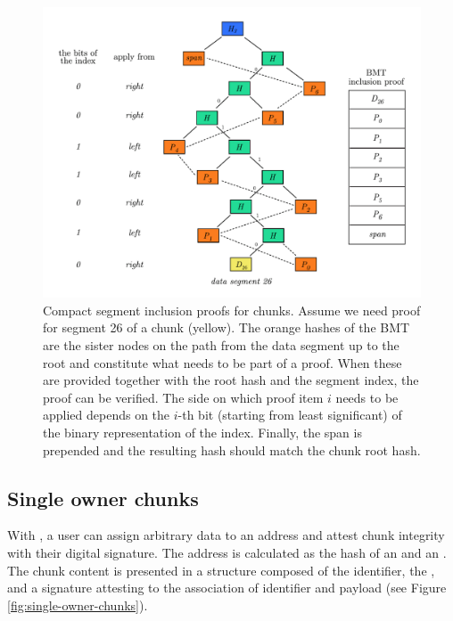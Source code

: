 \begin{figure}[htbp]
\centering
\includegraphics[width=\textwidth]{fig/inclusion-proof_new.pdf}
\caption[Compact segment inclusion proofs for chunks \statusgreen]{Compact segment inclusion proofs for chunks. Assume we need proof for segment 26 of a chunk (yellow). The orange hashes of the BMT are the sister nodes on the path from the data segment up to the root and constitute what needs to be part of a proof. When these are provided together with the root hash and the segment index, the proof can be verified. The side on which proof item $i$ needs to be applied depends on the $i$-th bit (starting from least significant) of the binary representation of the index. Finally, the span is prepended and the resulting hash should match the chunk root hash.}
\label{fig:chunk-inclusion}
\end{figure}


\subsection{Single owner chunks\statusgreen}\label{sec:single-owner-chunks}

With , a user can assign arbitrary data to an address and attest chunk integrity with their digital signature. The address is calculated as the hash of an  and an . The chunk content is presented in a  structure composed of the identifier, the , and a signature attesting to the association of identifier and payload (see Figure \ref{fig:single-owner-chunks}).

